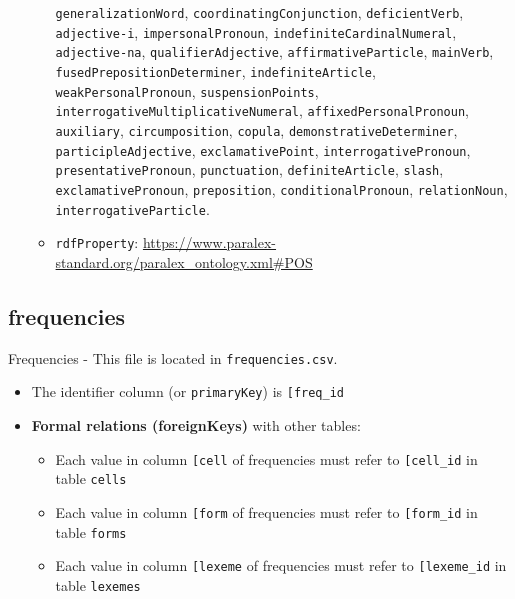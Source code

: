 \begin{itemize}
\begin{itemize}
    \texttt{generalizationWord}, \texttt{coordinatingConjunction},
    \texttt{deficientVerb}, \texttt{adjective-i},
    \texttt{impersonalPronoun}, \texttt{indefiniteCardinalNumeral},
    \texttt{adjective-na}, \texttt{qualifierAdjective},
    \texttt{affirmativeParticle}, \texttt{mainVerb},
    \texttt{fusedPrepositionDeterminer}, \texttt{indefiniteArticle},
    \texttt{weakPersonalPronoun}, \texttt{suspensionPoints},
    \texttt{interrogativeMultiplicativeNumeral},
    \texttt{affixedPersonalPronoun}, \texttt{auxiliary},
    \texttt{circumposition}, \texttt{copula},
    \texttt{demonstrativeDeterminer}, \texttt{participleAdjective},
    \texttt{exclamativePoint}, \texttt{interrogativePronoun},
    \texttt{presentativePronoun}, \texttt{punctuation},
    \texttt{definiteArticle}, \texttt{slash},
    \texttt{exclamativePronoun}, \texttt{preposition},
    \texttt{conditionalPronoun}, \texttt{relationNoun},
    \texttt{interrogativeParticle}.
  \item
    \texttt{rdfProperty}:
    \url{https://www.paralex-standard.org/paralex_ontology.xml\#POS}
  \end{itemize}
\end{itemize}

\hypertarget{frequencies}{%
\subsection{\texorpdfstring{\textbf{frequencies}}{frequencies}}\label{frequencies}}

Frequencies - This file is located in \texttt{frequencies.csv}.

\begin{itemize}
\item
  The identifier column (or \texttt{primaryKey}) is
  \texttt{{[}\textquotesingle{}freq\_id\textquotesingle{}{]}}
\item
  \textbf{Formal relations (foreignKeys)} with other tables:

  \begin{itemize}
  \tightlist
  \item
    Each value in column
    \texttt{{[}\textquotesingle{}cell\textquotesingle{}{]}} of
    frequencies must refer to
    \texttt{{[}\textquotesingle{}cell\_id\textquotesingle{}{]}} in table
    \texttt{cells}
  \item
    Each value in column
    \texttt{{[}\textquotesingle{}form\textquotesingle{}{]}} of
    frequencies must refer to
    \texttt{{[}\textquotesingle{}form\_id\textquotesingle{}{]}} in table
    \texttt{forms}
  \item
    Each value in column
    \texttt{{[}\textquotesingle{}lexeme\textquotesingle{}{]}} of
    frequencies must refer to
    \texttt{{[}\textquotesingle{}lexeme\_id\textquotesingle{}{]}} in
    table \texttt{lexemes}
  \end{itemize}
\end{itemize}

